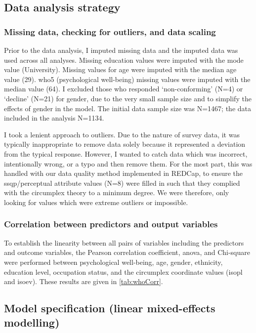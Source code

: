 \subsection{Data analysis strategy}

\subsubsection*{Missing data, checking for outliers, and data scaling}

Prior to the data analysis, I imputed missing data and the imputed data was used across all analyses. Missing education values were imputed with the mode value (University). Missing values for age were imputed with the median age value (29). \gls{who5} (psychological well-being) missing values were imputed with the median value (64). I excluded those who responded `non-conforming' (N=4) or `decline' (N=21) for gender, due to the very small sample size and to simplify the effects of gender in the model. The initial data sample size was N=1467; the data included in the analysis N=1134.

I took a lenient approach to outliers. Due to the nature of survey data, it was typically inappropriate to remove data solely because it represented a deviation from the typical response. However, I wanted to catch data which was incorrect, intentionally wrong, or a typo and then remove them. For the most part, this was handled with our data quality method implemented in REDCap, to ensure the \gls{ssqp}/perceptual attribute values (N=8) were filled in such that they complied with the circumplex theory to a minimum degree. We were therefore, only looking for values which were extreme outliers or impossible.

\subsubsection*{Correlation between predictors and output variables}
To establish the linearity between all pairs of variables including the predictors and outcome variables, the Pearson correlation coefficient, \gls{anova}, and Chi-square were performed between psychological well-being, age, gender, ethnicity, education level, occupation status, and the circumplex coordinate values (\gls{isopl} and \gls{isoev}). These results are given in \cref{tab:whoCorr}.

\subsection{Model specification (linear mixed-effects modelling)}

